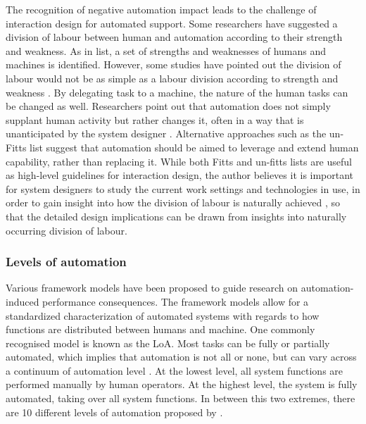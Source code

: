 The recognition of negative automation impact leads to the challenge of interaction design for automated support.  Some researchers have suggested a division of labour between human and automation according to their strength and weakness. As in \cite{Fitts} list, a set of strengths and weaknesses of humans and machines is identified. However, some studies have pointed out the division of labour would not be as simple as a labour division according to strength and weakness \citep{Bradshaw2011}. By delegating task to a machine, the nature of the human tasks can be changed as well. Researchers point out that automation does not simply supplant human activity but rather changes it, often in a way that is unanticipated by the system designer \citep{Bradshaw2011}. Alternative approaches such as the un-Fitts list \citep{Hoffman2002} suggest that automation should be aimed to leverage and extend human capability, rather than replacing it.  While both Fitts and un-fitts lists are useful as high-level guidelines for interaction design, the author believes it is important for system designers to study the current work settings and technologies in use, in order to gain insight into how the division of labour is naturally achieved \citep{Crabtree2012}, so that the detailed design implications can be drawn from insights into naturally occurring division of labour. \\


\subsubsection{Levels of automation}\label{sec:lrloa}
Various framework models have been proposed to guide research on automation-induced performance consequences. The framework models allow for a standardized characterization of automated systems with regards to how functions are distributed between humans and machine. One commonly recognised model is known as the \acf{LoA}. Most tasks can be fully or partially automated, which implies that automation is not all or none, but can vary across a continuum of automation level \citep{Wickens2010}. At the lowest level, all system functions are performed manually by human operators.  At the highest level, the system is fully automated, taking over all system functions. In between this two extremes, there are 10 different levels of automation proposed by \cite{Wickens2010}. \\

